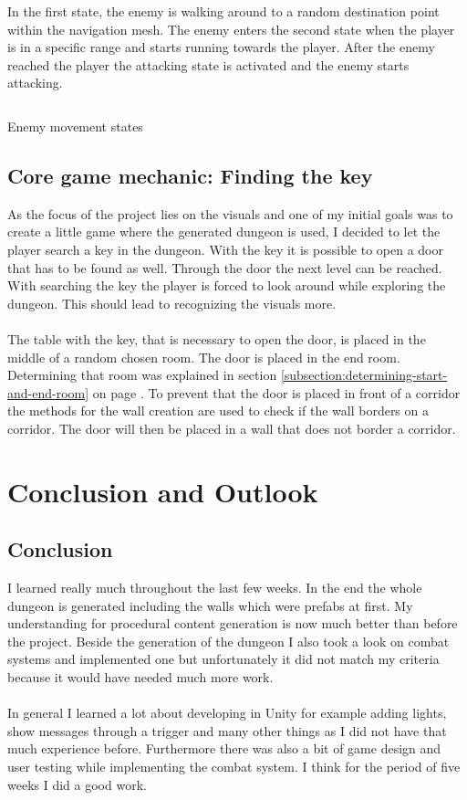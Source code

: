 \documentclass[a4paper,11pt,oneside]{scrreprt}
\begin{document}
In the first state, the enemy is walking around to a random destination point within the navigation mesh. The enemy enters the second state when the player is in a specific range and starts running towards the player. After the enemy reached the player the attacking state is activated and the enemy starts attacking.
\begin{listing}[ht]
    \inputminted[fontsize=\footnotesize,linenos]{csharp}{code/Enemy.cs}
    \caption[Enemy movement states]{Enemy movement states}
    \label{code:enemy-movement-states}
\end{listing}

\section{Core game mechanic: Finding the key}
\label{section:core-game-mechanic}
As the focus of the project lies on the visuals and one of my initial goals was to create a little game where the generated dungeon is used, I decided to let the player search a key in the dungeon. With the key it is possible to open a door that has to be found as well. Through the door the next level can be reached. With searching the key the player is forced to look around while exploring the dungeon. This should lead to recognizing the visuals more.
\\
\\
The table with the key, that is necessary to open the door, is placed in the middle of a random chosen room. The door is placed in the end room. Determining that room was explained in section \ref{subsection:determining-start-and-end-room} on page \pageref{subsection:determining-start-and-end-room}. To prevent that the door is placed in front of a corridor the methods for the wall creation are used to check if the wall borders on a corridor. The door will then be placed in a wall that does not border a corridor.

\chapter{Conclusion and Outlook}
\label{chapter:conclusion-and-outlook}

\section{Conclusion}
\label{section:conclusion}
I learned really much throughout the last few weeks. In the end the whole dungeon is generated including the walls which were prefabs at first. My understanding for procedural content generation is now much better than before the project. Beside the generation of the dungeon I also took a look on combat systems and implemented one but unfortunately it did not match my criteria because it would have needed much more work.  
\\
\\
In general I learned a lot about developing in Unity for example adding lights, show messages through a trigger and many other things as I did not have that much experience before. Furthermore there was also a bit of game design and user testing while implementing the combat system. I think for the period of five weeks I did a good work.
\end{document}
